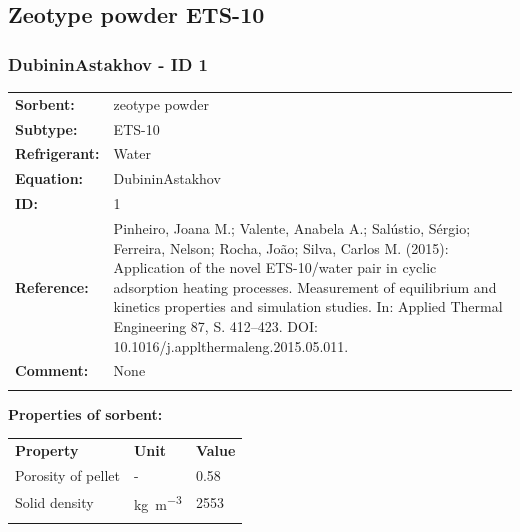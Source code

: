 \subsection{Zeotype powder ETS-10}
%
\subsubsection{DubininAstakhov - ID 1}
%
\begin{tabular}[l]{|lp{11.5cm}|}
\hline
\addlinespace

\textbf{Sorbent:} & zeotype powder \\
\textbf{Subtype:} & ETS-10 \\
\textbf{Refrigerant:} & Water \\
\textbf{Equation:} & DubininAstakhov \\
\textbf{ID:} & 1 \\
\textbf{Reference:} & Pinheiro, Joana M.; Valente, Anabela A.; Salústio, Sérgio; Ferreira, Nelson; Rocha, João; Silva, Carlos M. (2015): Application of the novel ETS-10/water pair in cyclic adsorption heating processes. Measurement of equilibrium and kinetics properties and simulation studies. In: Applied Thermal Engineering 87, S. 412–423. DOI: 10.1016/j.applthermaleng.2015.05.011. \\
\textbf{Comment:} & None \\

\addlinespace
\hline
\end{tabular}
\newline

\textbf{Properties of sorbent:}
\newline
%
\begin{longtable}[l]{lll}
\toprule
\addlinespace
\textbf{Property} & \textbf{Unit} & \textbf{Value} \\
\addlinespace
\midrule
\endhead
\bottomrule
\endfoot
\bottomrule
\endlastfoot
\addlinespace

Porosity of pellet & - & 0.58\\
Solid density & \si{\kilogram\per\cubic\meter} & 2553\\

\addlinespace\end{longtable}

